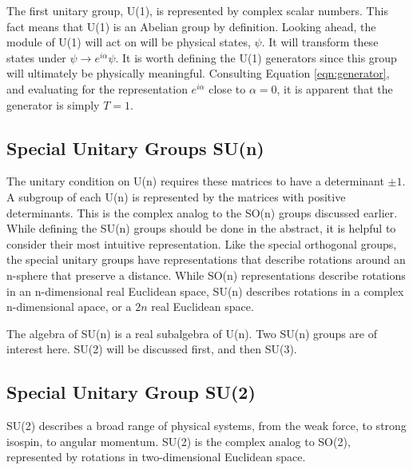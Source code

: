 The first unitary group, U(1), is represented by complex scalar numbers.
This fact means that U(1) is an Abelian group by definition.
Looking ahead, the module of U(1) will act on will be physical states, $\psi$.
It will transform these states under $\psi\to e^{i\alpha}\psi$.
It is worth defining the U(1) generators since this group will ultimately be physically meaningful.
Consulting Equation \ref{eqn:generator}, and evaluating for the representation $e^{i\alpha}$ close to $\alpha=0$, it is apparent that the generator is simply $T=1$.

\subsection{Special Unitary Groups SU(n)}\label{sec:specialUnitary}
The unitary condition on U(n) requires these matrices to have a determinant $\pm1$.
A subgroup of each U(n) is represented by the matrices with positive determinants.
This is the complex analog to the SO(n) groups discussed earlier.
While defining the SU(n) groups should be done in the abstract, it is helpful to consider their most intuitive representation.
Like the special orthogonal groups, the special unitary groups have representations that describe rotations around an n-sphere that preserve a distance.
While SO(n) representations describe rotations in an n-dimensional real Euclidean space, SU(n) describes rotations in a complex n-dimensional apace, or a $2n$ real Euclidean space. \check

The algebra of SU(n) is a real subalgebra of U(n).
Two SU(n) groups are of interest here. 
SU(2) will be discussed first, and then SU(3).

\subsection{Special Unitary Group SU(2)}
SU(2) describes a broad range of physical systems, from the weak force, to strong isospin, to angular momentum.
SU(2) is the complex analog to SO(2), represented by rotations in two-dimensional Euclidean space.

